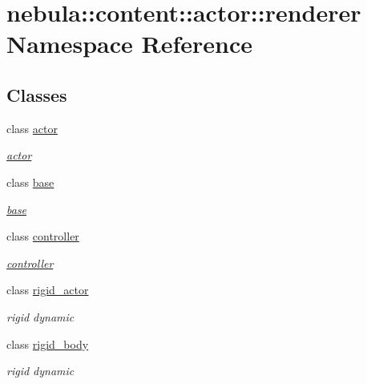 \hypertarget{namespacenebula_1_1content_1_1actor_1_1renderer}{
\section{nebula::content::actor::renderer Namespace Reference}
\label{namespacenebula_1_1content_1_1actor_1_1renderer}
}
\subsection*{Classes}
\begin{DoxyCompactItemize}
\item 
class \hyperlink{classnebula_1_1content_1_1actor_1_1renderer_1_1actor}{actor}
\begin{DoxyCompactList}\small\item\em \hyperlink{classnebula_1_1content_1_1actor_1_1renderer_1_1actor}{actor} \item\end{DoxyCompactList}\item 
class \hyperlink{classnebula_1_1content_1_1actor_1_1renderer_1_1base}{base}
\begin{DoxyCompactList}\small\item\em \hyperlink{classnebula_1_1content_1_1actor_1_1renderer_1_1base}{base} \item\end{DoxyCompactList}\item 
class \hyperlink{classnebula_1_1content_1_1actor_1_1renderer_1_1controller}{controller}
\begin{DoxyCompactList}\small\item\em \hyperlink{classnebula_1_1content_1_1actor_1_1renderer_1_1controller}{controller} \item\end{DoxyCompactList}\item 
class \hyperlink{classnebula_1_1content_1_1actor_1_1renderer_1_1rigid__actor}{rigid\_\-actor}
\begin{DoxyCompactList}\small\item\em rigid dynamic \item\end{DoxyCompactList}\item 
class \hyperlink{classnebula_1_1content_1_1actor_1_1renderer_1_1rigid__body}{rigid\_\-body}
\begin{DoxyCompactList}\small\item\em rigid dynamic \item\end{DoxyCompactList}\item 

\end{DoxyCompactItemize}
